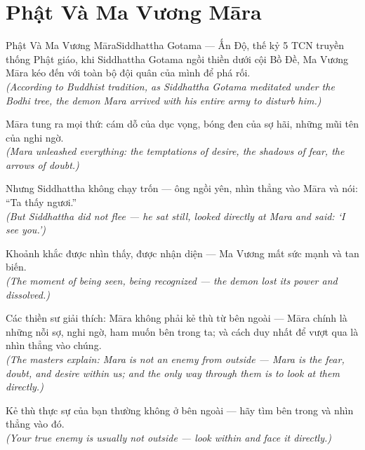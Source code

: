 \section{Phật Và Ma Vương Māra}
\begin{truyen}{Phật Và Ma Vương Māra}{Siddhattha Gotama --- Ấn Độ, thế kỷ 5 TCN}
 truyền thống Phật giáo, khi Siddhattha Gotama ngồi thiền dưới cội Bồ Đề, Ma Vương Māra kéo đến với toàn bộ đội quân của mình để phá rối.\\[4pt]
\textit{(According to Buddhist tradition, as Siddhattha Gotama meditated under the Bodhi tree, the demon Mara arrived with his entire army to disturb him.)}

Māra tung ra mọi thứ: cám dỗ của dục vọng, bóng đen của sợ hãi, những mũi tên của nghi ngờ.\\[4pt]
\textit{(Mara unleashed everything: the temptations of desire, the shadows of fear, the arrows of doubt.)}

Nhưng Siddhattha không chạy trốn --- ông ngồi yên, nhìn thẳng vào Māra và nói: ``Ta thấy ngươi.''\\[4pt]
\textit{(But Siddhattha did not flee --- he sat still, looked directly at Mara and said: `I see you.')}

Khoảnh khắc được nhìn thấy, được nhận diện --- Ma Vương mất sức mạnh và tan biến.\\[4pt]
\textit{(The moment of being seen, being recognized --- the demon lost its power and dissolved.)}

Các thiền sư giải thích: Māra không phải kẻ thù từ bên ngoài --- Māra chính là những nỗi sợ, nghi ngờ, ham muốn bên trong ta; và cách duy nhất để vượt qua là nhìn thẳng vào chúng.\\[4pt]
\textit{(The masters explain: Mara is not an enemy from outside --- Mara is the fear, doubt, and desire within us; and the only way through them is to look at them directly.)}

\end{truyen}
\begin{baihoc}
  Kẻ thù thực sự của bạn thường không ở bên ngoài --- hãy tìm bên trong và nhìn thẳng vào đó.\\[4pt]
  \textit{(Your true enemy is usually not outside --- look within and face it directly.)}
\end{baihoc}
